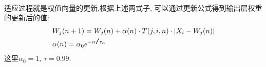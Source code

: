 \\

适应过程就是权值向量的更新,根据上述两式子, 可以通过更新公式得到输出层权重的更新后的值:
\begin{eqnarray}
  \quad & W_j(n+1) = W_j(n)+ \alpha(n)\cdot T(j,i,n) \cdot|X_i - W_j(n)|&\\
  \nonumber
  \quad & \alpha(n) = \alpha_0e^{- n  \verb|/| \tau_\alpha}&
\end{eqnarray}
这里$\alpha_0 = 1 $, $\tau = 0.99$.




